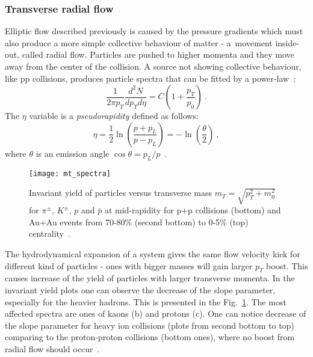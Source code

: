       \subsubsection{Transverse radial flow}
        Elliptic flow described previously is caused by the pressure gradients which must also produce a more simple collective behaviour of matter - a~movement inside-out, called radial flow.
        Particles are pushed to higher momenta and they move away from the center of the collision.
        A source not showing collective behaviour, like pp collisions, produces particle spectra that can be fitted by a power-law~\cite{drkisiel}:
        \begin{equation}
          \frac{1}{2\pi p_T} \frac{d^2 N}{d p_T d \eta} = C \left( 1 +\frac{p_T}{p_0} \right)~.
        \end{equation}
        The $\eta$ variable is a \textit{pseudorapidity} defined as follows:
        \begin{equation}
          \eta = \frac{1}{2} \ln \left( \frac{p + p_L}{p - p_L} \right) = -\ln \left(\frac{\theta}{2} \right)~,
        \end{equation}
        where $\theta$ is an emission angle $\cos \theta = p_L / p$~.
        \begin{figure}[h]
          \centering
          \texttt{[image: mt\_spectra]}
          \caption{Invariant yield of particles versus transverse mass $m_T = \sqrt{p^2_T + m_0^2}$ for $\pi^{\pm}$, $K^{\pm}$, $p$ and $\bar{p}$ at mid-rapidity for p+p collisions (bottom) and Au+Au events from 70-80\% (second bottom) to 0-5\% (top) centrality~\cite{mtspectra}.}
          \label{fig:invariant_yield}
        \end{figure}

        The hydrodynamical expansion of a system gives the same flow velocity kick for different kind of particles - ones with bigger masses will gain larger $p_T$ boost.
        This causes increase of the yield of particles with larger transverse momenta.
        In the invariant yield plots one can observe the decrease of the slope parameter, especially for the heavier hadrons.
        This is presented in the Fig.~\ref{fig:invariant_yield}.
        The most affected spectra are ones of kaons (b) and protons (c).
        One can notice decrease of the slope parameter for heavy ion collisions (plots from second bottom to top) comparing to the proton-proton collisions (bottom ones), where no boost from radial flow should occur~\cite{drkisiel}.

